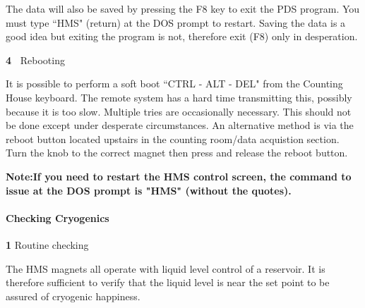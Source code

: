 \begin{description}
\item{}\hskip0.3in The data will also be saved by pressing the F8 key to
exit the
PDS program. You must type ``HMS" (return) at the DOS prompt to restart.
Saving the data is a good idea but exiting the program is not,
therefore exit (F8) only in desperation.
\item{\bf 4~}\hskip0.1in Rebooting
\item{}\hskip0.3in It is possible to perform a soft boot ``CTRL - ALT - DEL"
from the Counting House keyboard.  The remote system has a hard time
transmitting this, possibly because it is too slow.  Multiple tries are
occasionally necessary.  This should not be done except under desperate
circumstances.
An alternative method is via the reboot button located upstairs in
the counting room/data acquistion section.  Turn the knob to the
correct magnet then press and release the reboot button.

\item{}\hskip0.3in {\bf Note:If you need to restart the HMS control screen, the command to issue at the DOS
prompt is "HMS" (without the quotes).}


\end{description}

\paragraph{Checking Cryogenics}

\begin{description}
\item{\bf 1}\hskip0.1in Routine checking
\item{}\hskip0.3in The HMS magnets all operate with liquid level control of a
reservoir. It is therefore sufficient to verify that the liquid level
is near the set point to be assured of cryogenic happiness.
\end{description}

